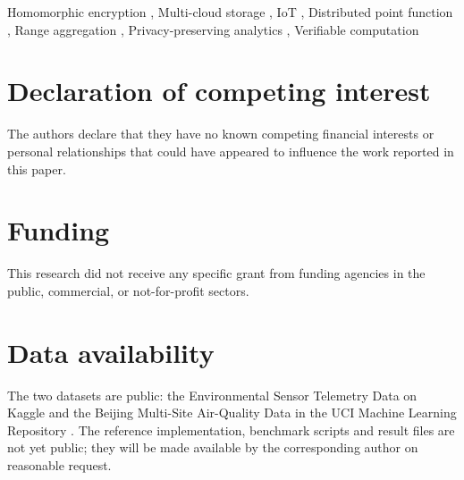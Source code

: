 \documentclass[a4paper,fleqn]{cas-sc}
\newif\ifanonymous
\begin{document}
\begin{keywords}
Homomorphic encryption \sep
Multi-cloud storage \sep
IoT \sep
Distributed point function \sep
Range aggregation \sep
Privacy-preserving analytics \sep
Verifiable computation
\end{keywords}

\maketitle



\ifanonymous\else\printcredits\fi

\section*{Declaration of competing interest}
The authors declare that they have no known competing financial interests or
personal relationships that could have appeared to influence the work reported
in this paper.

\section*{Funding}
This research did not receive any specific grant from funding agencies in the
public, commercial, or not-for-profit sectors.

\section*{Data availability}
The two datasets are public: the Environmental Sensor Telemetry Data on Kaggle
\citep{stafford_2020_environmental} and the Beijing Multi-Site Air-Quality
Data in the UCI Machine Learning Repository \citep{chen2019beijing}. The
reference implementation, benchmark scripts and result files are not yet
public; they will be made available by the corresponding author on reasonable
request.
\end{document}
